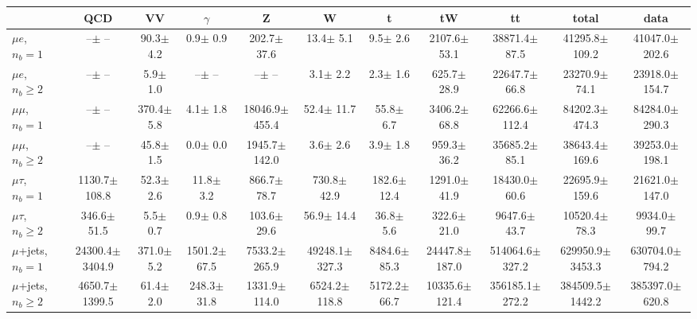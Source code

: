 


    \begin{tabular}{l|cccccccc|cc}
    \hline
        & QCD & VV  & $\gamma$ & Z & W & t & tW & tt & total & data      \\
    \hline
    
    $\mu e$, $n_b=1$                   &       --$\pm$     -- &     90.3$\pm$    4.2 &      0.9$\pm$    0.9 &    202.7$\pm$   37.6 &     13.4$\pm$    5.1 &      9.5$\pm$    2.6 &   2107.6$\pm$   53.1 &  38871.4$\pm$   87.5 &  41295.8$\pm$  109.2 &  41047.0$\pm$  202.6 \\ 
    $\mu e$, $n_b\geq2$                &       --$\pm$     -- &      5.9$\pm$    1.0 &       --$\pm$     -- &       --$\pm$     -- &      3.1$\pm$    2.2 &      2.3$\pm$    1.6 &    625.7$\pm$   28.9 &  22647.7$\pm$   66.8 &  23270.9$\pm$   74.1 &  23918.0$\pm$  154.7 \\ 
    \hline
    $\mu\mu$, $n_b=1$                  &       --$\pm$     -- &    370.4$\pm$    5.8 &      4.1$\pm$    1.8 &  18046.9$\pm$  455.4 &     52.4$\pm$   11.7 &     55.8$\pm$    6.7 &   3406.2$\pm$   68.8 &  62266.6$\pm$  112.4 &  84202.3$\pm$  474.3 &  84284.0$\pm$  290.3 \\ 
    $\mu\mu$, $n_b\geq2$               &       --$\pm$     -- &     45.8$\pm$    1.5 &      0.0$\pm$    0.0 &   1945.7$\pm$  142.0 &      3.6$\pm$    2.6 &      3.9$\pm$    1.8 &    959.3$\pm$   36.2 &  35685.2$\pm$   85.1 &  38643.4$\pm$  169.6 &  39253.0$\pm$  198.1 \\ 
    \hline
    $\mu\tau$, $n_b=1$                 &   1130.7$\pm$  108.8 &     52.3$\pm$    2.6 &     11.8$\pm$    3.2 &    866.7$\pm$   78.7 &    730.8$\pm$   42.9 &    182.6$\pm$   12.4 &   1291.0$\pm$   41.9 &  18430.0$\pm$   60.6 &  22695.9$\pm$  159.6 &  21621.0$\pm$  147.0 \\ 
    $\mu\tau$, $n_b\geq2$              &    346.6$\pm$   51.5 &      5.5$\pm$    0.7 &      0.9$\pm$    0.8 &    103.6$\pm$   29.6 &     56.9$\pm$   14.4 &     36.8$\pm$    5.6 &    322.6$\pm$   21.0 &   9647.6$\pm$   43.7 &  10520.4$\pm$   78.3 &   9934.0$\pm$   99.7 \\ 
    \hline
    $\mu$+jets, $n_b=1$                &  24300.4$\pm$ 3404.9 &    371.0$\pm$    5.2 &   1501.2$\pm$   67.5 &   7533.2$\pm$  265.9 &  49248.1$\pm$  327.3 &   8484.6$\pm$   85.3 &  24447.8$\pm$  187.0 & 514064.6$\pm$  327.2 & 629950.9$\pm$ 3453.3 & 630704.0$\pm$  794.2 \\ 
    $\mu$+jets, $n_b\geq2$             &   4650.7$\pm$ 1399.5 &     61.4$\pm$    2.0 &    248.3$\pm$   31.8 &   1331.9$\pm$  114.0 &   6524.2$\pm$  118.8 &   5172.2$\pm$   66.7 &  10335.6$\pm$  121.4 & 356185.1$\pm$  272.2 & 384509.5$\pm$ 1442.2 & 385397.0$\pm$  620.8 \\ 

\end{tabular}
